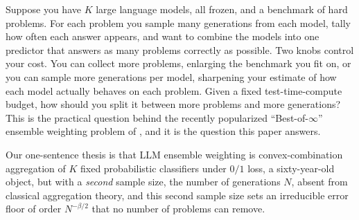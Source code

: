 \documentclass{article} %
\begin{document}
Suppose you have $K$ large language models, all frozen, and a benchmark of hard
problems. For each problem you sample many generations from each model, tally
how often each answer appears, and want to combine the models into one predictor
that answers as many problems correctly as possible. Two knobs control your cost.
You can collect more problems, enlarging the benchmark you fit on, or you can
sample more generations per model, sharpening your estimate of how each model
actually behaves on each problem. Given a fixed test-time-compute budget, how
should you split it between more problems and more generations? This is the
practical question behind the recently popularized ``Best-of-$\infty$'' ensemble
weighting problem of \citet{komiyama2026best}, and it is the question this paper
answers.

Our one-sentence thesis is that LLM ensemble weighting is convex-combination
aggregation of $K$ fixed probabilistic classifiers under $0/1$ loss, a
sixty-year-old object, but with a \emph{second} sample size, the number of
generations $N$, absent from classical aggregation theory, and this second
sample size sets an irreducible error floor of order $N^{-\beta/2}$ that no
number of problems can remove.
\end{document}
